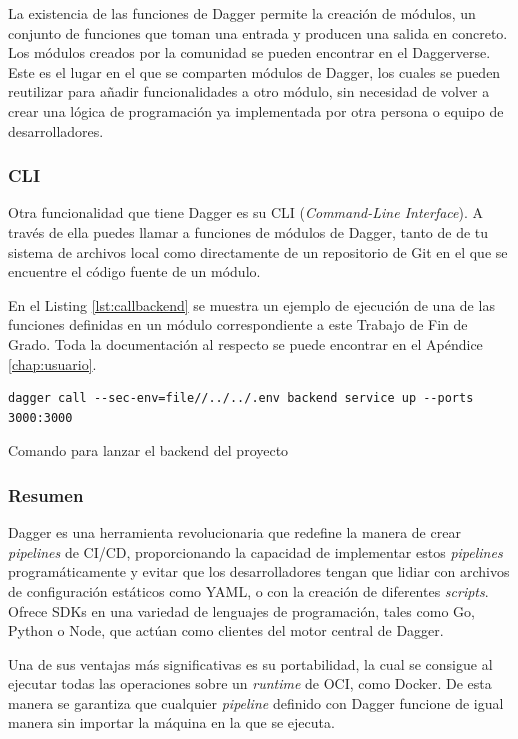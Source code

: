 La existencia de las funciones de Dagger permite la creación de módulos, un conjunto de funciones que toman una entrada y producen una salida en concreto. Los módulos creados por la comunidad se pueden encontrar en el Daggerverse\cite{daggerverse}. Este es el lugar en el que se comparten módulos de Dagger, los cuales se pueden reutilizar para añadir funcionalidades a otro módulo, sin necesidad de volver a crear una lógica de programación ya implementada por otra persona o equipo de desarrolladores.

\subsubsection*{CLI}

Otra funcionalidad que tiene Dagger es su CLI\cite{cli} (\textit{Command-Line Interface}). A través de ella puedes llamar a funciones de módulos de Dagger, tanto de de tu sistema de archivos local como directamente de un repositorio de Git en el que se encuentre el código fuente de un módulo.

En el Listing \ref{lst:callbackend} se muestra un ejemplo de ejecución de una de las funciones definidas en un módulo correspondiente a este Trabajo de Fin de Grado. Toda la documentación al respecto se puede encontrar en el Apéndice \ref{chap:usuario}.

\begin{listing}[!ht]
  \begin{verbatim}
dagger call --sec-env=file//../../.env backend service up --ports 3000:3000
  \end{verbatim}
  \caption{Comando para lanzar el backend del proyecto}
  \label{lst:callbackend}
\end{listing}

\subsubsection*{Resumen}

Dagger es una herramienta revolucionaria que redefine la manera de crear \textit{pipelines} de CI/CD, proporcionando la capacidad de implementar estos \textit{pipelines} programáticamente y evitar que los desarrolladores tengan que lidiar con archivos de configuración estáticos como YAML, o con la creación de diferentes \textit{scripts}. Ofrece SDKs en una variedad de lenguajes de programación, tales como Go, Python o Node, que actúan como clientes del motor central de Dagger.

Una de sus ventajas más significativas es su portabilidad, la cual se consigue al ejecutar todas las operaciones sobre un \textit{runtime} de OCI, como Docker. De esta manera se garantiza que cualquier \textit{pipeline} definido con Dagger funcione de igual manera sin importar la máquina en la que se ejecuta.


